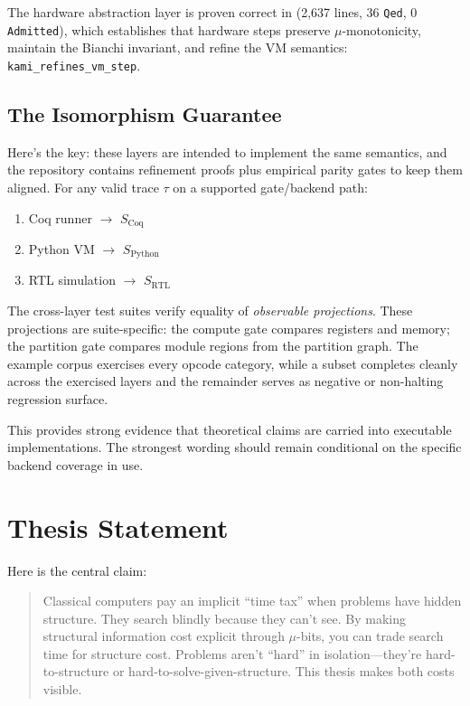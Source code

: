 The hardware abstraction layer is proven correct in  (2,637 lines, 36 \texttt{Qed}, 0 \texttt{Admitted}), which establishes that hardware steps preserve $\mu$-monotonicity, maintain the Bianchi invariant, and refine the VM semantics: \texttt{kami\_refines\_vm\_step}.

\subsection{The Isomorphism Guarantee}

Here's the key: these layers are intended to implement the same semantics, and the repository contains refinement proofs plus empirical parity gates to keep them aligned. For any valid trace $\tau$ on a supported gate/backend path:

\begin{enumerate}
    \item Coq runner $\to$ $S_{\text{Coq}}$
    \item Python VM $\to$ $S_{\text{Python}}$
    \item RTL simulation $\to$ $S_{\text{RTL}}$
\end{enumerate}

The cross-layer test suites verify equality of \emph{observable projections}. These projections are suite-specific: the compute gate compares registers and memory; the partition gate compares module regions from the partition graph. The example corpus exercises every opcode category, while a subset completes cleanly across the exercised layers and the remainder serves as negative or non-halting regression surface.

This provides strong evidence that theoretical claims are carried into executable implementations. The strongest wording should remain conditional on the specific backend coverage in use.

\section{Thesis Statement}

Here is the central claim:

\begin{quote}
    Classical computers pay an implicit ``time tax'' when problems have hidden structure. They search blindly because they can't see. By making structural information cost explicit through $\mu$-bits, you can trade search time for structure cost. Problems aren't ``hard'' in isolation---they're hard-to-structure or hard-to-solve-given-structure. This thesis makes both costs visible.
\end{quote}

